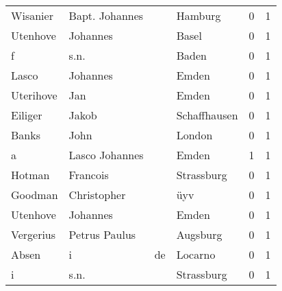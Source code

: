 \documentclass[10pt,a4paper,landscape]{article}
\begin{document}
\begin{longtable}{llllrr}
                 Wisanier &                     Bapt. Johannes &             &                                     Hamburg &          0 &         1 \\
                 Utenhove &                           Johannes &             &                                       Basel &          0 &         1 \\
                        f &                               s.n. &             &                                       Baden &          0 &         1 \\
                    Lasco &                           Johannes &             &                                       Emden &          0 &         1 \\
                Uterihove &                                Jan &             &                                       Emden &          0 &         1 \\
                  Eiliger &                              Jakob &             &                                Schaffhausen &          0 &         1 \\
                    Banks &                               John &             &                                      London &          0 &         1 \\
                        a &                     Lasco Johannes &             &                                       Emden &          1 &         1 \\
                   Hotman &                           Francois &             &                                  Strassburg &          0 &         1 \\
                  Goodman &                        Christopher &             &                                         üyv &          0 &         1 \\
                 Utenhove &                           Johannes &             &                                       Emden &          0 &         1 \\
                Vergerius &                      Petrus Paulus &             &                                    Augsburg &          0 &         1 \\
                    Absen &                                  i &          de &                                     Locarno &          0 &         1 \\
                        i &                               s.n. &             &                                  Strassburg &          0 &         1 \\

\end{longtable}
\end{document}
